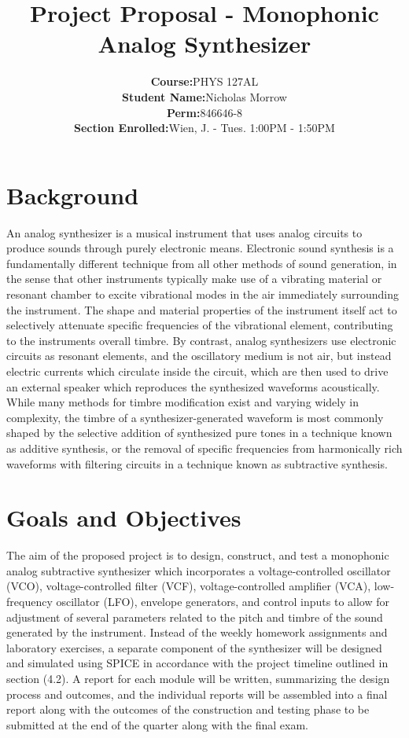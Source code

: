 \documentclass[10pt,a4paper]{article}
\author{\begin{tabular}{rl}
\textbf{Course:} & PHYS 127AL \\
\textbf{Student Name:} & Nicholas Morrow \\
\textbf{Perm:} & 846646-8 \\
\textbf{Section Enrolled:} & Wien, J. - Tues. 1:00PM - 1:50PM
\end{tabular}}
\title{Project Proposal - Monophonic Analog Synthesizer}
\begin{document}
	\begin{titlepage}
		\maketitle
		\tableofcontents
	\end{titlepage}

	\section{Background}
		An analog synthesizer is a musical instrument that uses analog circuits to produce sounds through purely electronic means. Electronic sound synthesis is a fundamentally different technique from all other methods of sound generation, in the sense that other instruments typically make use of a vibrating material or resonant chamber to excite vibrational modes in the air immediately surrounding the instrument. The shape and material properties of the instrument itself act to selectively attenuate specific frequencies of the vibrational element, contributing to the instruments overall timbre. By contrast, analog synthesizers use electronic circuits as resonant elements, and the oscillatory medium is not air, but instead electric currents which circulate inside the circuit, which are then used to drive an external speaker which reproduces the synthesized waveforms acoustically. While many methods for timbre modification exist and varying widely in complexity, the timbre of a synthesizer-generated waveform is most commonly shaped by the selective addition of synthesized pure tones in a technique known as additive synthesis, or the removal of specific frequencies from harmonically rich waveforms with filtering circuits in a technique known as subtractive synthesis.
	\section{Goals and Objectives}
		The aim of the proposed project is to design, construct, and test a monophonic analog subtractive synthesizer which incorporates a voltage-controlled oscillator (VCO), voltage-controlled filter (VCF), voltage-controlled amplifier (VCA), low-frequency oscillator (LFO), envelope generators, and control inputs to allow for adjustment of several parameters related to the pitch and timbre of the sound generated by the instrument. Instead of the weekly homework assignments and laboratory exercises, a separate component of the synthesizer will be designed and simulated using SPICE in accordance with the project timeline outlined in section (4.2). A report for each module will be written, summarizing the design process and outcomes, and the individual reports will be assembled into a final report along with the outcomes of the construction and testing phase to be submitted at the end of the quarter along with the final exam.
\end{document}
